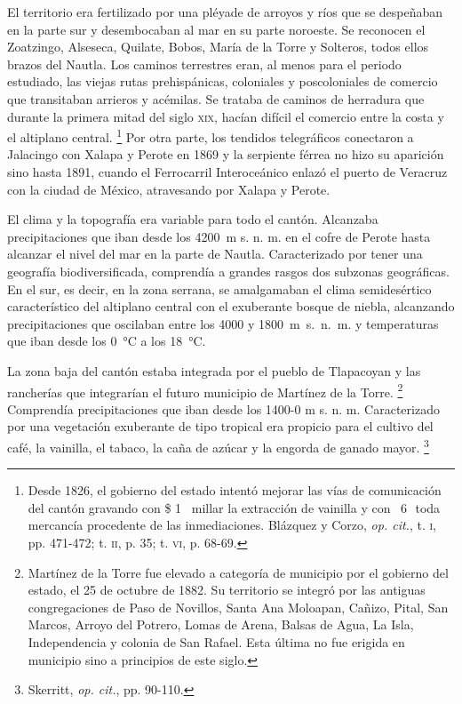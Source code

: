 \documentclass[14pt,twoside,final]{extbook} %
\let\oldfootnote\footnote
\renewcommand\footnote[1]{%
\oldfootnote{\hspace{1mm}#1}}
\begin{document}
El territorio era fertilizado por una pléyade de arroyos y ríos que se despeñaban en la parte sur y desembocaban al mar en su parte noroeste. Se reconocen el Zoatzingo, Alseseca, Quilate, Bobos, María de la Torre y Solteros, todos ellos brazos del Nautla. Los caminos terrestres eran, al menos para el periodo estudiado, las viejas rutas prehispánicas, coloniales y poscoloniales de comercio que transitaban arrieros y acémilas. Se trataba de caminos de herradura que durante la primera mitad del siglo \textsc{xix}, hacían difícil el comercio entre la costa y el altiplano central.\footnote{Desde 1826, el gobierno del estado intentó mejorar las vías de comunicación del cantón gravando con \$ 1 \texttimes\ millar la extracción de vainilla y con \textcent\ 6\,\textonequarter\ toda mercancía procedente de las inmediaciones. Blázquez y Corzo, \emph{op. cit.}, t. \textsc{i}, pp. 471-472; t. \textsc{ii}, p. 35; t. \textsc{vi}, p. 68-69.} Por otra parte, los tendidos telegráficos conectaron a Jalacingo con Xalapa y Perote en 1869 y la serpiente férrea no hizo su aparición sino hasta 1891, cuando el Ferrocarril Interoceánico enlazó el puerto de Veracruz con la ciudad de México, atravesando por Xalapa y Perote.

El clima y la topografía era variable para todo el cantón. Alcanzaba precipitaciones que iban desde los 4200~m s. n. m. en el cofre de Perote hasta alcanzar el nivel del mar en la parte de Nautla. Caracterizado por tener una geografía biodiversificada, comprendía a grandes rasgos dos subzonas geográficas. En el sur, es decir, en la zona serrana, se amalgamaban el clima semidesértico característico del altiplano central con el exuberante bosque de niebla, alcanzando precipitaciones que oscilaban entre los 4000 y \mbox{1800 m s. n. m.} y temperaturas que iban desde los 0~°C a los 18~°C.

La zona baja del cantón estaba integrada por el pueblo de Tlapacoyan y las rancherías que integrarían el futuro municipio de Martínez de la Torre.\footnote{Martínez de la Torre fue elevado a categoría de municipio por el gobierno del estado, el 25 de octubre de 1882. Su territorio se integró por las antiguas congregaciones de Paso de Novillos, Santa Ana Moloapan, Cañizo, Pital, San Marcos, Arroyo del Potrero, Lomas de Arena, Balsas de Agua, La Isla, Independencia y colonia de San Rafael. Esta última no fue erigida en municipio sino a principios de este siglo.} Comprendía precipitaciones que iban desde los 1400-0 m s. n. m. Caracterizado por una vegetación exuberante de tipo tropical era propicio para el cultivo del café, la vainilla, el tabaco, la caña de azúcar y la engorda de ganado mayor.\footnote{Skerritt, \emph{op. cit.}, pp. 90-110.}
\end{document}
